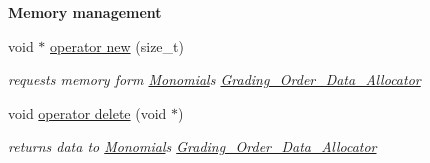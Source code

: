 \begin{Indent}\textbf{ Memory management}\par
\begin{DoxyCompactItemize}
\item 
\mbox{\label{group__polygroup_ae048964acf913ab33ee173ae2a558666}} 
void $\ast$ \hyperlink{group__polygroup_ae048964acf913ab33ee173ae2a558666}{operator new} (size\+\_\+t)
\begin{DoxyCompactList}\small\item\em requests memory form \hyperlink{group__polygroup_class_monomial}{Monomial}\textquotesingle{}s \hyperlink{group__memorygroup_class_grading___order___data___allocator}{Grading\+\_\+\+Order\+\_\+\+Data\+\_\+\+Allocator} \end{DoxyCompactList}\item 
\mbox{\label{group__polygroup_a86e0a5b7480a4f802e3b01b07a4d8920}} 
void \hyperlink{group__polygroup_a86e0a5b7480a4f802e3b01b07a4d8920}{operator delete} (void $\ast$)
\begin{DoxyCompactList}\small\item\em returns data to \hyperlink{group__polygroup_class_monomial}{Monomial}\textquotesingle{}s \hyperlink{group__memorygroup_class_grading___order___data___allocator}{Grading\+\_\+\+Order\+\_\+\+Data\+\_\+\+Allocator} \end{DoxyCompactList}\end{DoxyCompactItemize}
\end{Indent}
